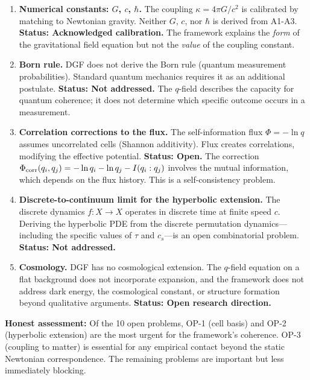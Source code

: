 \documentclass[reprint]{revtex4-2}
\begin{document}
\begin{enumerate}[leftmargin=*, label=\textbf{OP-\arabic*:}]
\item \textbf{Numerical constants: $G$, $c$, $\hbar$.} The coupling $\kappa = 4\pi G/c^2$ is calibrated by matching to Newtonian gravity. Neither $G$, $c$, nor $\hbar$ is derived from A1-A3. \textbf{Status: Acknowledged calibration.} The framework explains the \emph{form} of the gravitational field equation but not the \emph{value} of the coupling constant.

\item \textbf{Born rule.} DGF does not derive the Born rule (quantum measurement probabilities). Standard quantum mechanics requires it as an additional postulate. \textbf{Status: Not addressed.} The $q$-field describes the capacity for quantum coherence; it does not determine which specific outcome occurs in a measurement.

\item \textbf{Correlation corrections to the flux.} The self-information flux $\Phi=-\ln q$ assumes uncorrelated cells (Shannon additivity). Flux creates correlations, modifying the effective potential. \textbf{Status: Open.} The correction $\Phi_{\rm corr}(q_i,q_j) = -\ln q_i - \ln q_j - I(q_i:q_j)$ involves the mutual information, which depends on the flux history. This is a self-consistency problem.

\item \textbf{Discrete-to-continuum limit for the hyperbolic extension.} The discrete dynamics $f:X\to X$ operates in discrete time at finite speed $c$. Deriving the hyperbolic PDE from the discrete permutation dynamics---including the specific values of $\tau$ and $c_s$---is an open combinatorial problem. \textbf{Status: Not addressed.}

\item \textbf{Cosmology.} DGF has no cosmological extension. The $q$-field equation on a flat background does not incorporate expansion, and the framework does not address dark energy, the cosmological constant, or structure formation beyond qualitative arguments. \textbf{Status: Open research direction.}

\end{enumerate}

\textbf{Honest assessment:} Of the 10 open problems, OP-1 (cell basis) and OP-2 (hyperbolic extension) are the most urgent for the framework's coherence. OP-3 (coupling to matter) is essential for any empirical contact beyond the static Newtonian correspondence. The remaining problems are important but less immediately blocking.
\end{document}
